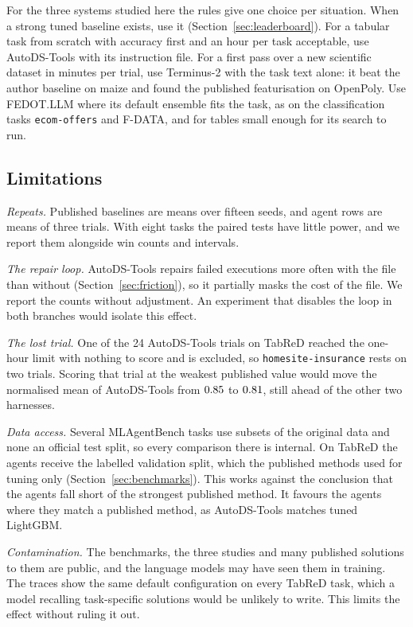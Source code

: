 For the three systems studied here the rules give one choice per situation.
When a strong tuned baseline exists, use it (Section~\ref{sec:leaderboard}). For a tabular task from scratch with
accuracy first and an hour per task acceptable, use AutoDS-Tools with its
instruction file. For a first pass over a new scientific dataset in minutes
per trial, use Terminus-2 with the task text alone: it beat the author
baseline on maize and found the published featurisation on OpenPoly. Use
FEDOT.LLM where its default ensemble fits the task, as on the classification
tasks \texttt{ecom-offers} and F-DATA, and for tables small enough for its
search to run.

\subsection{Limitations}
\label{sec:threats}

\emph{Repeats.} Published baselines are means over fifteen seeds, and agent rows
are means of three trials. With eight tasks the paired tests have little
power, and we report them alongside win counts and intervals.

\emph{The repair loop.} AutoDS-Tools repairs failed executions more often
with the file than without (Section~\ref{sec:friction}), so it partially
masks the cost of the file. We report the counts without adjustment. An
experiment that disables the loop in both branches would isolate this
effect.

\emph{The lost trial.} One of the 24 AutoDS-Tools trials on TabReD
reached the one-hour limit with nothing to score and is excluded, so
\texttt{homesite-insurance} rests on two trials. Scoring that trial at
the weakest published value would move the normalised mean of AutoDS-Tools
from $0.85$ to $0.81$, still ahead of the other two
harnesses.

\emph{Data access.} Several MLAgentBench tasks use subsets of the original
data and none an official test split, so every comparison there is
internal. On TabReD the agents receive the labelled validation split, which
the published methods used for tuning only (Section~\ref{sec:benchmarks}).
This works against the conclusion that the agents fall short of the
strongest published method. It favours the agents where they match a
published method, as AutoDS-Tools matches tuned LightGBM.

\emph{Contamination.} The benchmarks, the three studies and many published
solutions to them are public, and the language models may have seen them in
training. The traces show the same default configuration on every TabReD
task, which a model recalling task-specific solutions would be unlikely to
write. This limits the effect without ruling it out.

